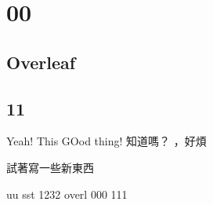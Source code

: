 
\chapter{00}
\section{Overleaf}
\section{11}

Yeah!
This
GOod thing! 知道嗎？
，好煩

試著寫一些新東西


uu
sst
1232
overl
000
111